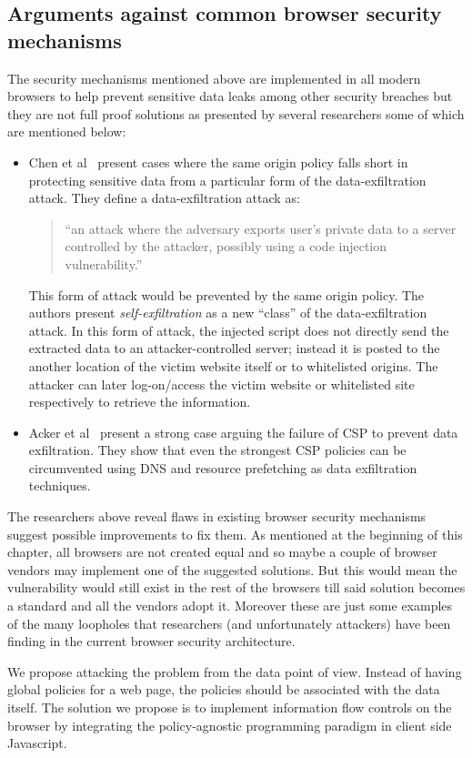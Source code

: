 \subsection{Arguments against common browser security mechanisms \label{sec:against}}
The security mechanisms mentioned above are implemented in all modern browsers to
help prevent sensitive data leaks among other security breaches but they are not
full proof solutions as presented by several researchers some of which are mentioned
below:
\begin{itemize}
  \item Chen et al~\cite{SelfExfil} present cases where the same origin policy falls short
  in protecting sensitive data from a particular form of the data-exfiltration attack.
  They define a data-exfiltration attack as:

  \begin{quotation}
    ``an attack where the adversary exports user's private data to a server controlled
    by the attacker, possibly using a code injection vulnerability.''
  \end{quotation}
  This form of attack would be prevented by the same origin policy. The authors present
  \textit{self-exfiltration} as a new ``class'' of the data-exfiltration attack. In
  this form of attack, the injected script does not directly send the extracted data
  to an attacker-controlled server; instead it is posted to the another location
  of the victim website itself or to whitelisted origins. The attacker can later
  log-on/access the victim website or whitelisted site respectively to retrieve the
  information.

  \item Acker et al~\cite{DataExfilCSP} present a strong case arguing the failure of
  CSP to prevent data exfiltration. They show that even the strongest CSP policies
  can be circumvented using DNS and resource prefetching as data exfiltration
  techniques.
\end{itemize}

The researchers above reveal flaws in existing browser security mechanisms suggest
possible improvements to fix them. As mentioned at the beginning of this chapter,
all browsers are not created equal and so maybe a couple of browser vendors may
implement one of the suggested solutions. But this would mean the vulnerability
would still exist in the rest of the browsers till said solution becomes a standard
and all the vendors adopt it. Moreover these are just some examples of the many
loopholes that researchers (and unfortunately attackers) have been finding in the
current browser security architecture.

We propose attacking the problem from the data point of view. Instead of having
global policies for a web page, the policies should be associated with the data
itself. The solution we propose is to implement information flow controls on the
browser by integrating the policy-agnostic programming paradigm in client side Javascript.
